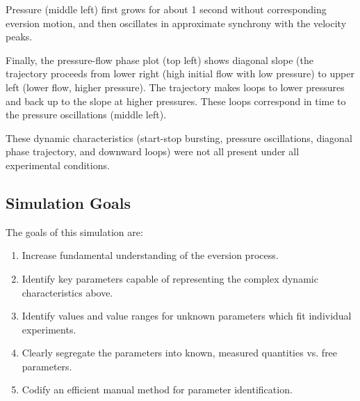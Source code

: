 \documentclass[letterpaper]{article}
\begin{document}
Pressure (middle left) first grows for about 1 second without corresponding eversion motion, and
then oscillates in approximate synchrony with the velocity peaks.

Finally, the pressure-flow phase plot (top left) shows diagonal slope (the trajectory proceeds from
lower right (high initial flow with low pressure) to upper left (lower flow, higher pressure).
The trajectory makes loops to lower pressures and back up to the slope at higher pressures.  These
loops correspond in time to the pressure oscillations (middle left).

These dynamic characteristics (start-stop bursting, pressure oscillations, diagonal phase trajectory, and
downward loops) were not all present under all experimental conditions.

\subsection{Simulation Goals}
The goals of this simulation are:
\begin{enumerate}
  \item Increase fundamental understanding of the eversion process.
  \item Identify key parameters capable of representing the complex dynamic characteristics above.
  \item Identify values and value ranges for unknown parameters which fit individual experiments.
  \item Clearly segregate the parameters into known, measured quantities vs. free parameters.
  \item Codify an efficient manual method for parameter identification.
\end{enumerate}
\end{document}
